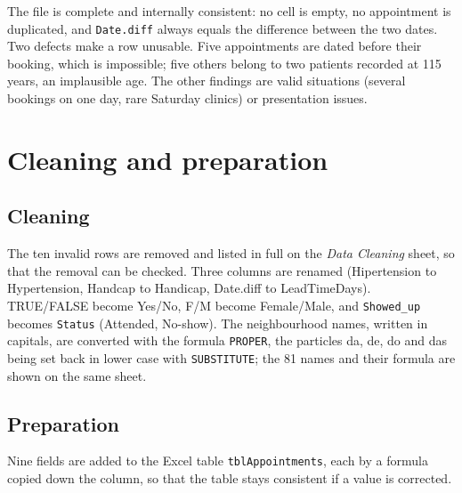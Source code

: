 \documentclass[12pt,a4paper]{article}
\newcommand{\F}[1]{{\small\texttt{#1}}}
\begin{document}
The file is complete and internally consistent: no cell is empty, no appointment is
duplicated, and \F{Date.diff} always equals the difference between the two dates. Two
defects make a row unusable. Five appointments are dated before their booking, which is
impossible; five others belong to two patients recorded at 115 years, an implausible
age. The other findings are valid situations (several bookings on one day, rare Saturday
clinics) or presentation issues.

\section{Cleaning and preparation}\label{sec:cleaning}

\subsection{Cleaning}

The ten invalid rows are removed and listed in full on the \emph{Data Cleaning} sheet,
so that the removal can be checked. Three columns are renamed (Hipertension to
Hypertension, Handcap to Handicap, Date.diff to LeadTimeDays). TRUE/FALSE become Yes/No,
F/M become Female/Male, and \F{Showed\_up} becomes \F{Status} (Attended, No-show). The
neighbourhood names, written in capitals, are converted with the formula
\F{PROPER}, the particles da, de, do and das being set back in lower case with
\F{SUBSTITUTE}; the 81 names and their formula are shown on the same sheet.

\subsection{Preparation}

Nine fields are added to the Excel table \F{tblAppointments}, each by a formula copied
down the column, so that the table stays consistent if a value is corrected.
\end{document}
